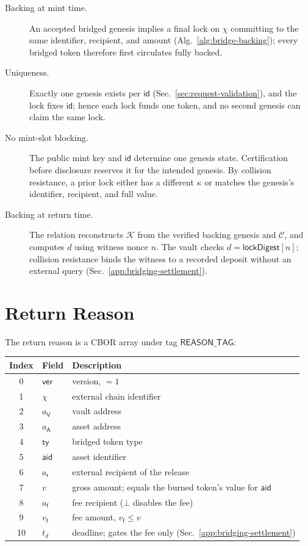 \begin{description}
\item[Backing at mint time.] An accepted bridged genesis implies a final lock on $\chi$ committing to the same identifier, recipient, and amount (Alg.~\ref{alg:bridge-backing}); every bridged token therefore first circulates fully backed.
\item[Uniqueness.] Exactly one genesis exists per $\mathsf{id}$ (Sec.~\ref{sec:request-validation}), and the lock fixes $\mathsf{id}$; hence each lock funds one token, and no second genesis can claim the same lock.
\item[No mint-slot blocking.] The public mint key and $\mathsf{id}$ determine one genesis state. Certification before disclosure reserves it for the intended genesis. By collision resistance, a prior lock either has a different $\kappa$ or matches the genesis's identifier, recipient, and full value.
\item[Backing at return time.] The relation reconstructs $\mathcal{K}$ from the verified backing genesis and $\mathcal{C}$, and computes $d$ using witness nonce $n$. The vault checks $d = \mathsf{lockDigest}[n]$; collision resistance binds the witness to a recorded deposit without an external query (Sec.~\ref{app:bridging-settlement}).
\end{description}

\section{Return Reason}\label{app:bridging-reason}

The return reason is a CBOR array under tag $\mathsf{REASON\_TAG}$:

\begin{longtable}{clp{8.4cm}}
\textbf{Index} & \textbf{Field} & \textbf{Description} \\
\hline
\endhead
0  & $\mathsf{ver}$        & version, $=1$ \\
1  & $\chi$                & external chain identifier \\
2  & $a_\mathsf{V}$        & vault address \\
3  & $a_\mathsf{A}$        & asset address \\
4  & $\mathsf{ty}$         & bridged token type \\
5  & $\mathsf{aid}$        & asset identifier \\
6  & $a_\mathsf{r}$        & external recipient of the release \\
7  & $v$                   & gross amount; equals the burned token's value for $\mathsf{aid}$ \\
8  & $a_\mathsf{f}$        & fee recipient ($\bot$ disables the fee) \\
9  & $v_\mathsf{f}$        & fee amount, $v_\mathsf{f} \le v$ \\
10 & $t_d$                 & deadline; gates the fee only (Sec.~\ref{app:bridging-settlement}) \\
\end{longtable}

